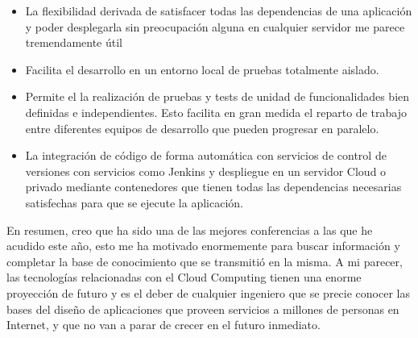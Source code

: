 \begin{itemize}
\item La flexibilidad derivada de satisfacer todas las dependencias de una aplicación y poder desplegarla sin preocupación alguna en cualquier servidor me parece tremendamente útil
\item Facilita el desarrollo en un entorno local de pruebas totalmente aislado.
\item Permite el la realización de pruebas y tests de unidad de funcionalidades bien definidas e independientes. Esto facilita en gran medida el reparto de trabajo entre diferentes equipos de desarrollo que pueden progresar en paralelo.
\item La integración de código de forma automática con servicios de control de versiones con servicios como Jenkins y despliegue en un servidor Cloud o privado mediante contenedores que tienen todas las dependencias necesarias satisfechas para que se ejecute la aplicación.
\end{itemize}



En resumen, creo que ha sido una de las mejores conferencias a las que he acudido este año, esto me ha motivado enormemente para buscar información y completar la base de conocimiento que se transmitió en la misma. A mi parecer, las tecnologías relacionadas con el Cloud Computing tienen una enorme proyección de futuro y es el deber de cualquier ingeniero que se precie conocer las bases del diseño de aplicaciones que proveen servicios a millones de personas en Internet, y que no van a parar de crecer en el futuro inmediato. 

